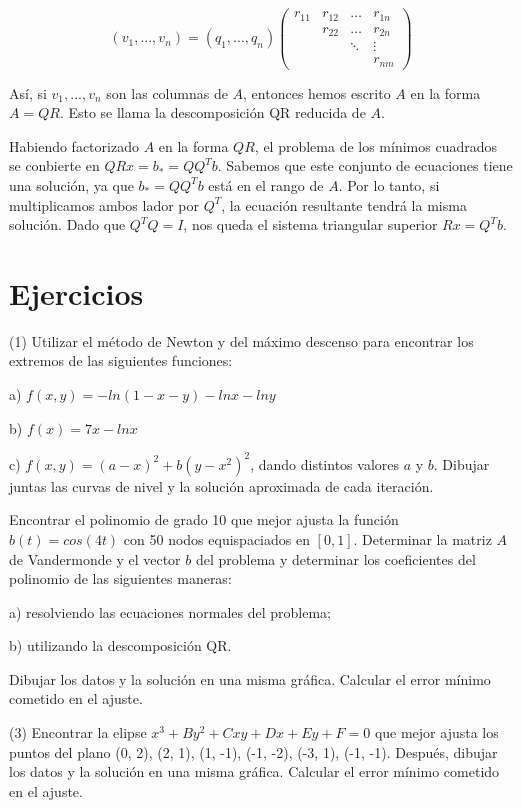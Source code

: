 \[ (v_1,..., v_n) = (q_1, ..., q_n) \begin{pmatrix}
    r_{11} & r_{12} & \dots & r_{1n} \\
           & r_{22} & \dots & r_{2n} \\
           &        & \ddots & \vdots \\
           &        &       & r_{nm}
\end{pmatrix} \]

Así, si $v_1,..., v_n$ son las columnas de $A$, entonces hemos escrito $A$ en la forma $A = QR$. Esto se llama la descomposición QR reducida de $A$.

Habiendo factorizado $A$ en la forma $QR$, el problema de los mínimos cuadrados se conbierte en $QRx = b_* = Q Q^T b$. Sabemos que este conjunto de ecuaciones tiene una solución, ya que $b_* = Q Q^T b$ está en el rango de $A$. Por lo tanto, si multiplicamos ambos lador por $Q^T$, la ecuación resultante tendrá la misma solución. Dado que $Q^T Q = I$, nos queda el sistema triangular superior $Rx = Q^T b$.

\section*{Ejercicios}
\noindent (1) Utilizar el método de Newton y del máximo descenso para encontrar los extremos de las siguientes funciones:

a) $f(x, y) = -ln(1 - x - y) - lnx - lny$

b) $f(x) = 7x - lnx$

c) $f(x, y) = (a - x)^2 + b(y - x^2)^2$, dando distintos valores $a$ y $b$. Dibujar juntas las curvas de nivel y la solución aproximada de cada iteración.

\noindent Encontrar el polinomio de grado 10 que mejor ajusta la función $b(t) = cos(4t)$ con 50 nodos equispaciados en $[0, 1]$. Determinar la matriz $A$ de Vandermonde y el vector $b$ del problema y determinar los coeficientes del polinomio de las siguientes maneras:

a) resolviendo las ecuaciones normales del problema;

b) utilizando la descomposición QR.

Dibujar los datos y la solución en una misma gráfica. Calcular el error mínimo cometido en el ajuste.

\noindent (3) Encontrar la elipse $x^3 + By^2 + Cxy + Dx + Ey + F = 0$ que mejor ajusta los puntos del plano (0, 2), (2, 1), (1, -1), (-1, -2), (-3, 1), (-1, -1). Después, dibujar los datos y la solución en una misma gráfica. Calcular el error mínimo cometido en el ajuste.

